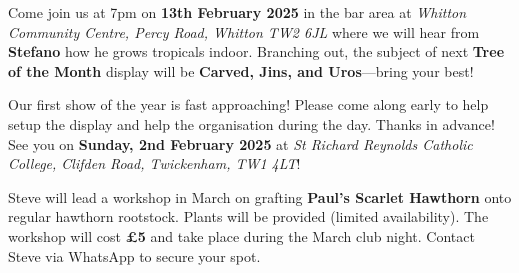 \noindent
Come join us at 7pm on \textbf{13th February 2025} in the bar area at \emph{Whitton Community Centre, Percy Road, Whitton TW2 6JL} where we will hear from \textbf{Stefano} how he grows tropicals indoor. Branching out, the subject of next \textbf{Tree of the Month} display will be \textbf{Carved, Jins, and Uros}—bring your best!
	
\noindent
Our first show of the year is fast approaching! Please come along early to help setup the display and help the organisation during the day. Thanks in advance! See you on \textbf{Sunday, 2nd February 2025} at \emph{St Richard Reynolds Catholic College, Clifden Road, Twickenham, TW1 4LT}! 
	
\noindent
Steve will lead a workshop in March on grafting \textbf{Paul's Scarlet Hawthorn} onto regular hawthorn rootstock. Plants will be provided (limited availability). The workshop will cost \textbf{£5} and take place during the March club night. Contact Steve via WhatsApp to secure your spot. 

\closearticle